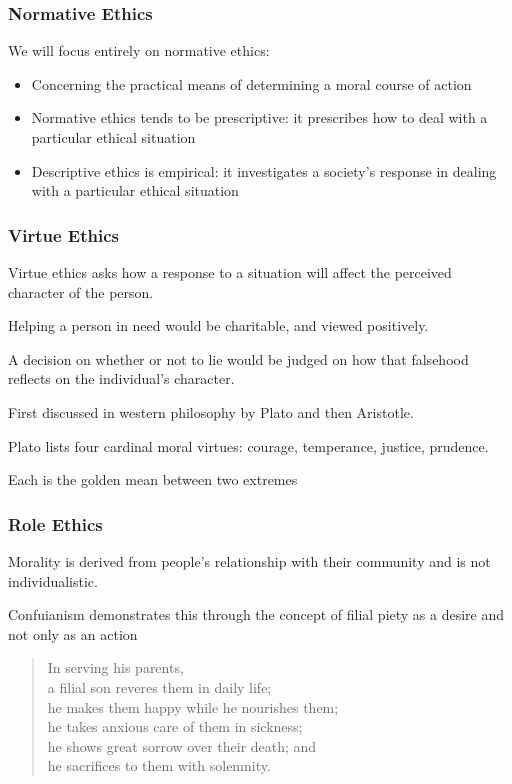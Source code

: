 \begin{frame}
\frametitle{Normative Ethics}

We will focus entirely on normative ethics:

\begin{itemize}
\item Concerning the practical means of determining a moral course of action
\item Normative ethics tends to be prescriptive:  it prescribes how to deal with a particular ethical situation
\item Descriptive ethics is empirical:  it investigates a society's response in dealing with a particular ethical situation
\end{itemize}

\end{frame}



\begin{frame}
\frametitle{Virtue Ethics}

Virtue ethics asks how a response to a situation will affect the perceived character of the person.

Helping a person in need would be charitable, and viewed positively.

A decision on whether or not to lie would be judged on how that falsehood reflects on the individual's character.

First discussed in western philosophy by Plato and then Aristotle.

Plato lists four cardinal moral virtues: courage, temperance, justice, prudence.

Each is the golden mean between two extremes
\end{frame}



\begin{frame}
\frametitle{Role Ethics}

Morality is derived from people's relationship with their community and is not individualistic.

Confuianism demonstrates this through
the concept of filial piety as a desire and
not only as an action

\begin{quote}
In serving his parents,\\
a filial son reveres them in daily life;\\
he makes them happy while he nourishes them;\\
he takes anxious care of them in sickness;\\
he shows great sorrow over their death; and\\
he sacrifices to them with solemnity.\\
\end{quote}


\end{frame}





